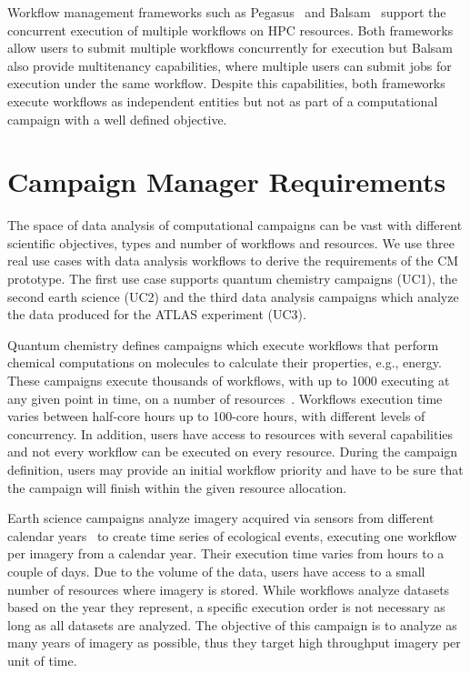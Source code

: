 Workflow management frameworks such as Pegasus~\cite{deelman2015pegasus} and
Balsam~\cite{salim2019balsam} support the concurrent execution of multiple
workflows on HPC resources. Both frameworks allow users to submit multiple
workflows concurrently for execution but Balsam also provide multitenancy
capabilities, where multiple users can submit jobs for execution under the same
workflow. Despite this capabilities, both frameworks execute workflows as
independent entities but not as part of a computational campaign with a well
defined objective.

\section{Campaign Manager Requirements}
\label{sec:cm_req}

The space of data analysis of computational campaigns can be vast with different
scientific objectives, types and number of workflows and resources. We use three
real use cases with data analysis workflows to derive the requirements of the
CM prototype. The first use case supports quantum chemistry
campaigns (UC1), the second earth science (UC2) and the third data analysis
campaigns which analyze the data produced for the ATLAS experiment (UC3).

Quantum chemistry defines campaigns which execute workflows that perform
chemical computations on molecules to calculate their properties, e.g., energy.
These campaigns execute thousands of workflows, with up to 1000 executing at any
given point in time, on a number of resources~\cite{smith2020molssi}. Workflows
execution time varies between half-core hours up to 100-core hours, with
different levels of concurrency. In addition, users have access to resources
with several capabilities and not every workflow can be executed on every
resource. During the campaign definition, users may provide an initial workflow
priority and have to be sure that the campaign will finish within the given
resource allocation.

Earth science campaigns analyze imagery acquired via sensors from different
calendar years~\cite{paraskevakos2019workflow} to create time series of
ecological events, executing one workflow per imagery from a calendar year.
Their execution time varies from hours to a couple of days. Due to the volume of
the data, users have access to a small number of resources where imagery is
stored. While workflows analyze datasets based on the year they represent, a
specific execution order is not necessary as long as all datasets are analyzed.
The objective of this campaign is to analyze as many years of imagery as
possible, thus they target high throughput imagery per unit of time.

